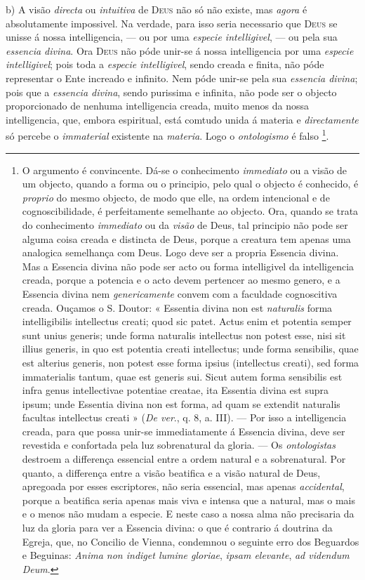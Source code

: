 b) A visão \emph{directa} ou \emph{intuitiva} de \textsc{Deus} não só não existe, mas \emph{agora} é absolutamente impossivel. Na verdade, para isso seria necessario que \textsc{Deus} se unisse á nossa intelligencia, --- ou por uma \emph{especie intelligivel}, --- ou pela sua \emph{essencia divina}. Ora \textsc{Deus} não póde unir-se á nossa intelligencia por uma \emph{especie}   \emph{intelligivel}; pois toda a \emph{especie intelligivel}, sendo creada e finita, não póde representar o Ente increado e infinito. Nem póde unir-se pela sua \emph{essencia divina}; pois que a \emph{essencia divina}, sendo purissima e infinita, não pode ser o objecto proporcionado de nenhuma intelligencia creada, muito menos da nossa intelligencia, que, embora espiritual, está comtudo unida á materia e \emph{directamente} só percebe o \emph{immaterial} existente na \emph{materia}. Logo o \emph{ontologismo} é falso \footnote{O argumento é convincente. Dá-se o conhecimento \emph{immediato} ou a visão de um objecto, quando a forma ou o principio, pelo qual o objecto é conhecido, é \emph{proprio} do mesmo objecto, de modo que elle, na ordem intencional e de cognoscibilidade, é perfeitamente semelhante ao objecto. Ora, quando se trata do conhecimento \emph{immediato} ou da \emph{visão} de Deus, tal principio não pode ser alguma coisa creada e distincta de Deus, porque a creatura tem apenas uma analogica semelhança com Deus. Logo deve ser a propria Essencia divina. Mas a Essencia divina não pode ser acto ou forma intelligivel da intelligencia creada, porque a potencia e o acto devem pertencer ao mesmo genero, e a Essencia divina nem \emph{genericamente} convem com a faculdade cognoscitiva creada. Ouçamos o S. Doutor: « Essentia divina non est \emph{naturalis} forma intelligibilis intellectus creati; quod sic patet. Actus enim et potentia semper sunt unius generis; unde forma naturalis intellectus non potest esse, nisi sit illius generis, in quo est potentia creati intellectus; unde forma sensibilis, quae est alterius generis, non potest esse forma ipsius (intellectus creati), sed forma immaterialis tantum, quae est generis sui. Sicut autem forma sensibilis est infra genus intellectivae potentiae creatae, ita Essentia divina est supra ipsum; unde Essentia divina non est forma, ad quam se extendit naturalis facultas intellectus creati » (\emph{De ver}., q. 8, a. III). --- Por isso a intelligencia creada, para que possa unir-se immediatamente á Essencia divina, deve ser revestida e confortada pela luz sobrenatural da gloria. --- Os \emph{ontologistas} destroem a differença essencial entre a ordem natural e a sobrenatural. Por quanto, a differença entre a visão beatifica e a visão natural de Deus, apregoada por esses escriptores, não seria essencial, mas apenas \emph{accidental}, porque a beatifica seria apenas mais viva e intensa que a natural, mas o mais e o menos não mudam a especie. E neste caso a nossa alma não precisaria da luz da gloria para ver a Essencia divina: o que é contrario á doutrina da Egreja, que, no Concilio de Vienna, condemnou o seguinte erro dos Beguardos e Beguinas: \emph{Anima non indiget lumine gloriae}, \emph{ipsam elevante}, \emph{ad videndum Deum}.}.


